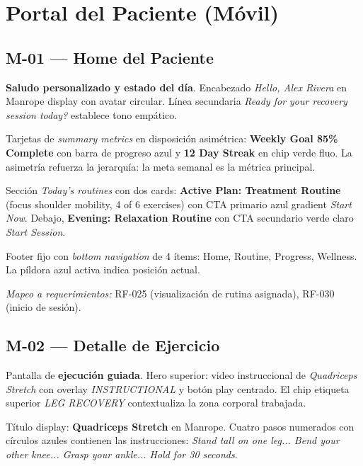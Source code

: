 \section{Portal del Paciente (Móvil)}

\subsection{M-01 --- Home del Paciente}

\textbf{Saludo personalizado y estado del día}. Encabezado \textit{Hello, Alex Rivera} en Manrope display con avatar circular. Línea secundaria \textit{Ready for your recovery session today?} establece tono empático.

Tarjetas de \textit{summary metrics} en disposición asimétrica: \textbf{Weekly Goal 85\% Complete} con barra de progreso azul y \textbf{12 Day Streak} en chip verde fluo. La asimetría refuerza la jerarquía: la meta semanal es la métrica principal.

Sección \textit{Today's routines} con dos cards: \textbf{Active Plan: Treatment Routine} (focus shoulder mobility, 4 of 6 exercises) con CTA primario azul gradient \textit{Start Now}. Debajo, \textbf{Evening: Relaxation Routine} con CTA secundario verde claro \textit{Start Session}.

Footer fijo con \textit{bottom navigation} de 4 ítems: Home, Routine, Progress, Wellness. La píldora azul activa indica posición actual.

\textit{Mapeo a requerimientos:} RF-025 (visualización de rutina asignada), RF-030 (inicio de sesión).


\subsection{M-02 --- Detalle de Ejercicio}

Pantalla de \textbf{ejecución guiada}. Hero superior: video instruccional de \textit{Quadriceps Stretch} con overlay \textit{INSTRUCTIONAL} y botón play centrado. El chip etiqueta superior \textit{LEG RECOVERY} contextualiza la zona corporal trabajada.

Título display: \textbf{Quadriceps Stretch} en Manrope. Cuatro pasos numerados con círculos azules contienen las instrucciones: \textit{Stand tall on one leg... Bend your other knee... Grasp your ankle... Hold for 30 seconds}.

